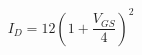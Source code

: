 \documentclass[preview]{standalone}
\begin{document}
\begin{align*}
I_D = 12 ( 1+\dfrac{V_{GS}}{4} )^2
\end{align*}
\end{document}
